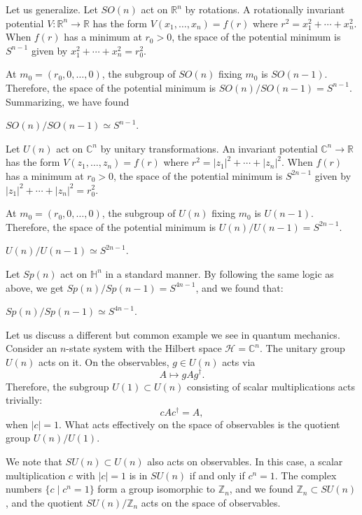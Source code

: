 \documentclass[12pt]{article}
\numberwithin{equation}{section}
\def\bC{\mathbb{C}}
\def\bH{\mathbb{H}}
\def\bR{\mathbb{R}}
\def\bZ{\mathbb{Z}}
\def\cH{\mathcal{H}}
\begin{document}
Let us generalize.
Let $SO(n)$ act on $\bR^n$ by rotations.
A rotationally invariant potential $V:\bR^n\to \bR$ 
has the form $V(x_1,\ldots,x_n)=f(r)$ where $r^2={x_1^2+\cdots+x_n^2}$.
When $f(r)$ has a minimum at $r_0>0$,
the space of the potential minimum is $S^{n-1}$ given by $x_1^2+\cdots + x_n^2=r_0^2$.

At $m_0=(r_0,0,\ldots,0)$, the subgroup of $SO(n)$ fixing $m_0$ is $SO(n-1)$.
Therefore, the space of the potential minimum is $SO(n)/SO(n-1)=S^{n-1}$.
Summarizing, we have found
\begin{proposition}
  \label{prop:SO/SO}
 $ SO(n)/SO(n-1) \simeq S^{n-1}$.
\end{proposition}

Let $U(n)$ act on $\bC^n$ by unitary transformations.
An invariant potential $\bC^n\to \bR$ has the form $V(z_1,\ldots,z_n)=f(r)$
where $r^2=|z_1|^2+\cdots+|z_n|^2$.
When $f(r)$ has a minimum at $r_0>0$,
the space of the potential minimum is $S^{2n-1}$ given by $|z_1|^2+\cdots + |z_n|^2=r_0^2$.

At $m_0=(r_0,0,\ldots,0)$, the subgroup of $U(n)$ fixing $m_0$ is $U(n-1)$.
Therefore, the space of the potential minimum is $U(n)/U(n-1)=S^{2n-1}$.
\begin{proposition}
  \label{prop:U/U}
$U(n)/U(n-1)\simeq S^{2n-1}$.
\end{proposition}

Let $Sp(n)$ act on $\bH^n$ in a standard manner.
By following the same logic as above, we get $Sp(n)/Sp(n-1)=S^{4n-1}$,
and we found that:
\begin{proposition}
  \label{prop:Sp/Sp}
$ Sp(n)/Sp(n-1)\simeq S^{4n-1}$.
\end{proposition}

Let us discuss a different but common example we see in quantum mechanics.
Consider an $n$-state system with the Hilbert space $\cH=\bC^n$.
The unitary group $U(n)$ acts on it.
On the observables, $g\in U(n)$ acts via \begin{equation}
  A\mapsto g A g^\dagger.
\end{equation}
Therefore, the subgroup $U(1) \subset U(n)$
consisting of scalar multiplications acts trivially: \begin{equation}
c A c^\dagger = A,
\end{equation} when $|c|=1$. 
What acts effectively on the space of observables is the quotient group $U(n)/U(1)$.

We note that $SU(n)\subset U(n)$ also acts on observables.
In this case, a scalar multiplication $c$ with $|c|=1$ is in $SU(n)$ if and only if $c^n=1$.
The complex numbers $\{c\mid c^n=1\}$ form a group isomorphic to $\bZ_n$,
and we found $\bZ_n \subset SU(n)$,
and the quotient $SU(n)/\bZ_n$ acts on the space of observables.
\end{document}
